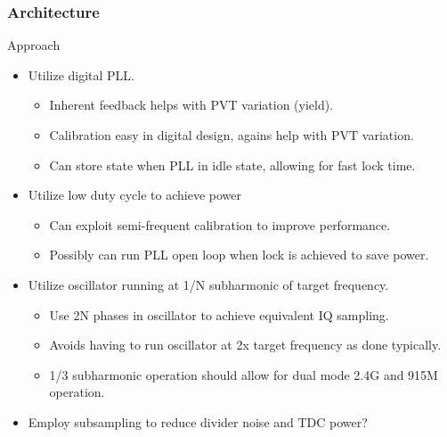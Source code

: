 \documentclass[t, screen, aspectratio=43]{beamer}
\begin{document}
\begin{frame}
  \frametitle{Architecture}
  \begin{block}{Approach}
    \begin{itemize}
      \footnotesize
      \item Utilize digital PLL.\@ 
      \begin{itemize}
        \footnotesize
        \item Inherent feedback helps with PVT variation (yield).
        \item Calibration easy in digital design, agains help with PVT variation.
        \item Can store state when PLL in idle state, allowing for fast lock time.
      \end{itemize}       
      \item Utilize low duty cycle to achieve power     
      \begin{itemize}
        \footnotesize
        \item Can exploit semi-frequent calibration to improve performance.
        \item Possibly can run PLL open loop when lock is achieved to save power.
      \end{itemize} 
      \item Utilize oscillator running at 1/N subharmonic of target frequency.
      \begin{itemize}
        \footnotesize
        \item Use 2N phases in oscillator to achieve equivalent IQ sampling.
        \item Avoids having to run oscillator at 2x target frequency as done typically.
        \item 1/3 subharmonic operation should allow for dual mode 2.4G and 915M operation.
      \end{itemize} 
      \item Employ subsampling to reduce divider noise and TDC power?
    \end{itemize}
  \end{block}    

\end{frame}

\end{document}

